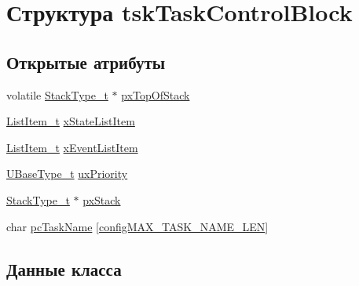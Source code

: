 \hypertarget{structtsk_task_control_block}{}\section{Структура tsk\+Task\+Control\+Block}
\label{structtsk_task_control_block}
\subsection*{Открытые атрибуты}
\begin{DoxyCompactItemize}
\item 
volatile \mbox{\hyperlink{portmacro_8h_a84e9a8ba132feed0b2401c1f4e2ac63c}{Stack\+Type\+\_\+t}} $\ast$ \mbox{\hyperlink{structtsk_task_control_block_a429a186c7f8e34aba1eef5e12d215b90}{px\+Top\+Of\+Stack}}
\item 
\mbox{\hyperlink{list_8h_a1a62d469392f9bfe2443e7efab9c8398}{List\+Item\+\_\+t}} \mbox{\hyperlink{structtsk_task_control_block_a16e0d20425d53ac78537e1fdb8834cf6}{x\+State\+List\+Item}}
\item 
\mbox{\hyperlink{list_8h_a1a62d469392f9bfe2443e7efab9c8398}{List\+Item\+\_\+t}} \mbox{\hyperlink{structtsk_task_control_block_a1a1612b6081a13683808284d93a9b28f}{x\+Event\+List\+Item}}
\item 
\mbox{\hyperlink{portmacro_8h_a646f89d4298e4f5afd522202b11cb2e6}{U\+Base\+Type\+\_\+t}} \mbox{\hyperlink{structtsk_task_control_block_a79187811e3d2a15595942e3b44237d85}{ux\+Priority}}
\item 
\mbox{\hyperlink{portmacro_8h_a84e9a8ba132feed0b2401c1f4e2ac63c}{Stack\+Type\+\_\+t}} $\ast$ \mbox{\hyperlink{structtsk_task_control_block_a9a0d71a9f95dd0609f9911d9efd79134}{px\+Stack}}
\item 
char \mbox{\hyperlink{structtsk_task_control_block_a67d61291794f38afb5be5132078bc24f}{pc\+Task\+Name}} \mbox{[}\mbox{\hyperlink{_free_r_t_o_s_config_8h_ac388dc4041aab6997348828eb27fc1a8}{config\+M\+A\+X\+\_\+\+T\+A\+S\+K\+\_\+\+N\+A\+M\+E\+\_\+\+L\+EN}}\mbox{]}
\end{DoxyCompactItemize}


\subsection{Данные класса}
\mbox{\label{structtsk_task_control_block_a67d61291794f38afb5be5132078bc24f}} 
